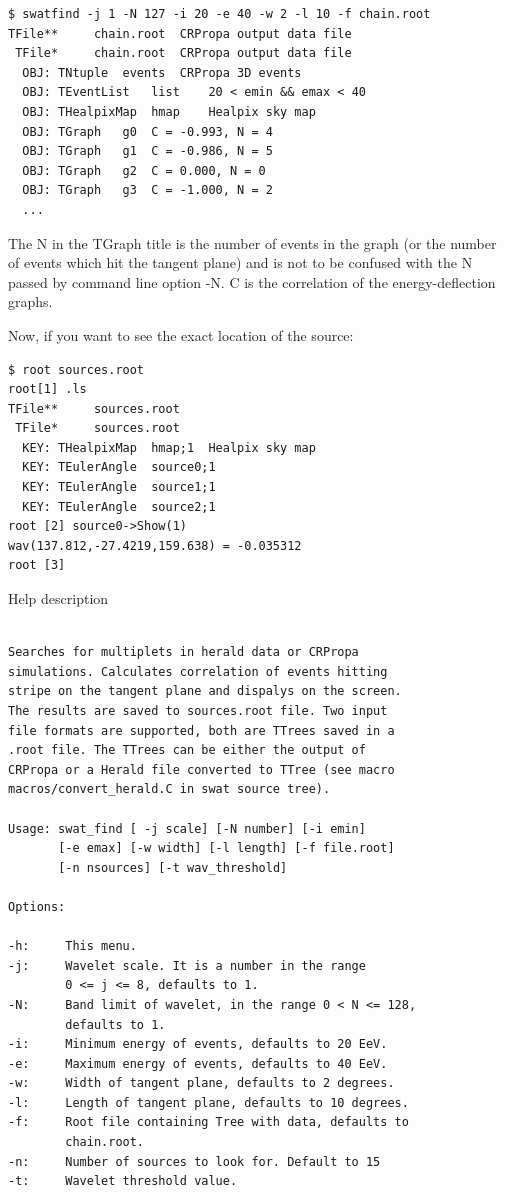 \documentclass[12pt]{article}
\begin{document}
{\bf \color{brown}
\begin{lstlisting}
$ swatfind -j 1 -N 127 -i 20 -e 40 -w 2 -l 10 -f chain.root
TFile**		chain.root	CRPropa output data file
 TFile*		chain.root	CRPropa output data file
  OBJ: TNtuple	events	CRPropa 3D events
  OBJ: TEventList	list	20 < emin && emax < 40 
  OBJ: THealpixMap	hmap	Healpix sky map
  OBJ: TGraph	g0	C = -0.993, N = 4 
  OBJ: TGraph	g1	C = -0.986, N = 5
  OBJ: TGraph	g2	C = 0.000, N = 0
  OBJ: TGraph	g3	C = -1.000, N = 2
  ...
\end{lstlisting}
}

The N in the TGraph title is the number of events in the graph (or the number of 
events which hit the tangent plane) and is not to be confused with the N passed by command line
option -N. C is the correlation of the energy-deflection graphs.

Now, if you want to see the exact location of the source:
{\bf \color{brown}
\begin{lstlisting}
$ root sources.root
root[1] .ls
TFile**		sources.root	
 TFile*		sources.root	
  KEY: THealpixMap	hmap;1	Healpix sky map
  KEY: TEulerAngle	source0;1	
  KEY: TEulerAngle	source1;1	
  KEY: TEulerAngle	source2;1	
root [2] source0->Show(1)
wav(137.812,-27.4219,159.638) = -0.035312
root [3] 
\end{lstlisting}
}

Help description
{\bf \color{textcolor}
\begin{lstlisting}

Searches for multiplets in herald data or CRPropa
simulations. Calculates correlation of events hitting
stripe on the tangent plane and dispalys on the screen.
The results are saved to sources.root file. Two input
file formats are supported, both are TTrees saved in a
.root file. The TTrees can be either the output of
CRPropa or a Herald file converted to TTree (see macro
macros/convert_herald.C in swat source tree).

Usage: swat_find [ -j scale] [-N number] [-i emin] 
       [-e emax] [-w width] [-l length] [-f file.root] 
       [-n nsources] [-t wav_threshold]

Options:

-h:     This menu.
-j:     Wavelet scale. It is a number in the range 
        0 <= j <= 8, defaults to 1.
-N:     Band limit of wavelet, in the range 0 < N <= 128,
        defaults to 1.
-i:     Minimum energy of events, defaults to 20 EeV.
-e:     Maximum energy of events, defaults to 40 EeV.
-w:     Width of tangent plane, defaults to 2 degrees.
-l:     Length of tangent plane, defaults to 10 degrees.
-f:     Root file containing Tree with data, defaults to
        chain.root.
-n:     Number of sources to look for. Default to 15
-t:     Wavelet threshold value.
\end{lstlisting}
}
\newpage
\end{document}
